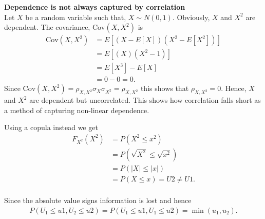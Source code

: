 \begin{example}\label{ex:CorrelationFail}
    \textbf{Dependence is not always captured by correlation}  \\
    Let $X$ be a random variable such that, $X \sim N(0,1)$. Obviously, $X$ and $X^2$ are dependent. The covariance, $\mathrm{Cov}(X,X^2)$ is 
    \begin{align*}
        \mathrm{Cov}(X,X^2) &= E \left[  (X-E\left[  X \right])(X^2-E\left[  X^2 \right])  \right]\\
         &=  E \left[  (X)(X^2-1)  \right]\\
         &= E \left[  X^3  \right] - E \left[  X  \right]\\
         &= 0-0 = 0 .
    \end{align*}
    Since $\mathrm{Cov}(X,X^2) = \rho_{X,X^2}\sigma_{X}\sigma_{X^2} = \rho_{X,X^2}$ this shows that $\rho_{X,X^2} = 0.$
    Hence, $X$ and $X^2$ are dependent but uncorrelated. This shows how correlation falls short as a method of capturing non-linear dependence.
    
    Using a copula instead we get
    \begin{align*}
    F_{X^2}(X^2) &= P(X^2 \leq x^2)\\
    &= P(\sqrt{X^2} \leq \sqrt{x^2})\\
    &= P(|X| \leq |x| )\\    
    &=P(X\leq x) = U2 \neq U1.\\
    \end{align*}

    Since the absolute value signs information is lost and hence 
    \begin{align*}
        P(U_1\leq u1, U_2\leq u2) = P(U_1\leq u1, U_1\leq u2) = \min(u_1,u_2).
    \end{align*}
    
\end{example}

